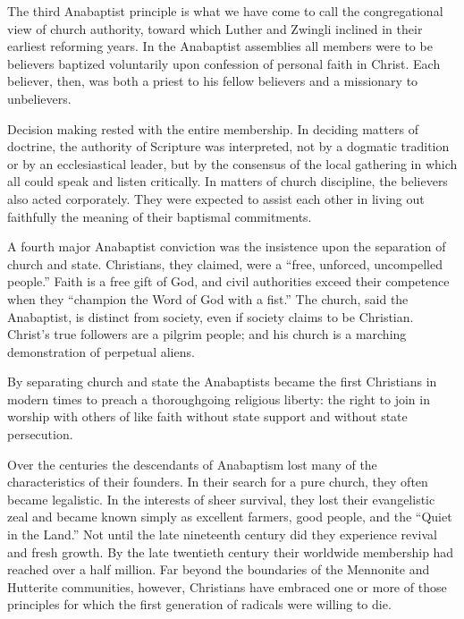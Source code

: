 The third Anabaptist principle is what we have come to call the congregational view of church
authority, toward which Luther and Zwingli inclined in their earliest reforming years. In the
Anabaptist assemblies all members were to be believers baptized voluntarily upon confession of
personal faith in Christ. Each believer, then, was both a priest to his fellow believers and a
missionary to unbelievers.

Decision making rested with the entire membership. In deciding matters of doctrine, the authority of
Scripture was interpreted, not by a dogmatic tradition or by an ecclesiastical leader, but by the
consensus of the local gathering in which all could speak and listen critically. In matters of
church discipline, the believers also acted corporately. They were expected to assist each other in
living out faithfully the meaning of their baptismal commitments.

A fourth major Anabaptist conviction was the insistence upon the separation of church and state.
Christians, they claimed, were a “free, unforced, uncompelled people.” Faith is a free gift of God,
and civil authorities exceed their competence when they “champion the Word of God with a fist.” The
church, said the Anabaptist, is distinct from society, even if society claims to be Christian.
Christ’s true followers are a pilgrim people; and his church is a marching demonstration of
perpetual aliens.

By separating church and state the Anabaptists became the first Christians in modern times to preach
a thoroughgoing religious liberty: the right to join in worship with others of like faith without
state support and without state persecution.

Over the centuries the descendants of Anabaptism lost many of the characteristics of their founders.
In their search for a pure church, they often became legalistic. In the interests of sheer survival,
they lost their evangelistic zeal and became known simply as excellent farmers, good people, and the
“Quiet in the Land.” Not until the late nineteenth century did they experience revival and fresh
growth. By the late twentieth century their worldwide membership had reached over a half million.
Far beyond the boundaries of the Mennonite and Hutterite communities, however, Christians have
embraced one or more of those principles for which the first generation of radicals were willing to
die.

